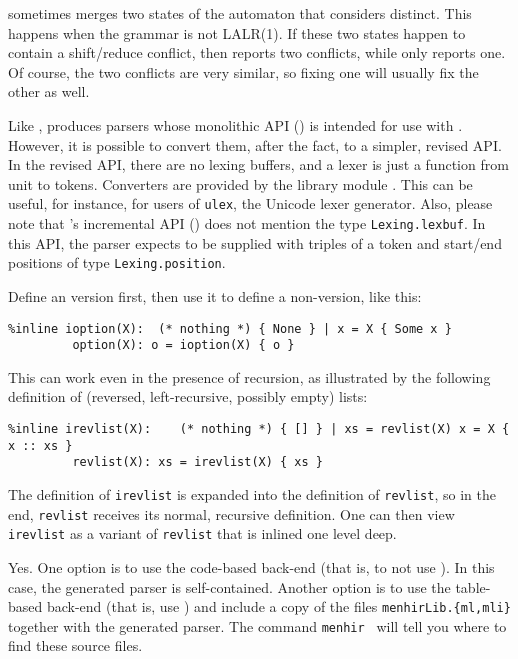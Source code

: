 \documentclass[onecolumn,11pt,nocopyrightspace,preprint]{sigplanconf}
\begin{document}
 \ocamlyacc sometimes merges two states
of the automaton that \menhir considers distinct. This happens
when the grammar is not LALR(1). If these two states happen to
contain a shift/reduce conflict, then \menhir reports two conflicts,
while \ocamlyacc only reports one. Of course, the two conflicts are
very similar, so fixing one will usually fix the other as well.

 Like \ocamlyacc, \menhir produces parsers whose monolithic API
() is intended for use with \ocamllex. However, it is
possible to convert them, after the fact, to a simpler, revised API. In the
revised API, there are no lexing buffers, and a lexer is just a function from
unit to tokens. Converters are provided by the library module
\menhirlibconvert. This can be useful, for instance, for users of
\texttt{ulex}, the Unicode lexer generator. Also, please note that \menhir's
incremental API () does not mention the type
\verb+Lexing.lexbuf+. In this API, the parser expects to be supplied with
triples of a token and start/end positions of type \verb+Lexing.position+.

 Define an \dinline version first, then use it to
define a non-\dinline version, like this:
\begin{verbatim}
%inline ioption(X):  (* nothing *) { None } | x = X { Some x }
         option(X): o = ioption(X) { o }
\end{verbatim}
This can work even in the presence of recursion, as illustrated by the
following definition of (reversed, left-recursive, possibly empty) lists:
\begin{verbatim}
%inline irevlist(X):    (* nothing *) { [] } | xs = revlist(X) x = X { x :: xs }
         revlist(X): xs = irevlist(X) { xs }
\end{verbatim}
The definition of \verb+irevlist+ is expanded into the definition of \verb+revlist+,
so in the end, \verb+revlist+ receives its normal, recursive definition. One can
then view \verb+irevlist+ as a variant of \verb+revlist+ that is inlined one level
deep.

Yes. One option is to use the code-based back-end (that is, to not
use \otable). In this case, the generated parser is self-contained. Another
option is to use the table-based back-end (that is, use \otable) and include a
copy of the files \verb+menhirLib.{ml,mli}+ together with the generated
parser. The command \texttt{menhir \osuggestmenhirlib} will tell you where to
find these source files.
\end{document}
